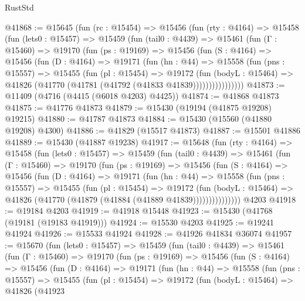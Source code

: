 \begin{lexlean}{RustStd}
\begin{coremodule}
@41868 := @15645
    (fun (rc : @15454) =>
    @15456
      (fun (rty : @4164) =>
      @15458
        (fun (lets0 : @15457) =>
        @15459
          (fun (tail0 : @4439) =>
          @15461
            (fun (Γ : @15460) =>
            @19170
              (fun (ps : @19169) =>
              @15456
                (fun (S : @4164) =>
                @15456
                  (fun (D : @4164) =>
                  @19171
                    (fun (hn : @44) =>
                    @15558
                      (fun (pns : @15557) =>
                      @15455
                        (fun (pl : @15454) =>
                        @19172
                          (fun (bodyL : @15464) =>
                          @41826 (@41770 (@41781 (@41792 (@41833 @41839))))))))))))))))
@41873 := @11409 (@4716 (@4415 (@6018 @4203) @4425))
@41874 := @41868 @41873
@41875 := @41776 @41873
@41879 := @15430 (@19194 (@41875 @19208) @19215)
@41880 := @41787 @41873
@41884 := @15430 (@15560 (@41880 @19208) @4300)
@41886 := @41829 (@15517 @41873)
@41887 := @15501 @41886
@41889 := @15430 (@41887 @19238)
@41917 := @15648
    (fun (rty : @4164) =>
    @15458
      (fun (lets0 : @15457) =>
      @15459
        (fun (tail0 : @4439) =>
        @15461
          (fun (Γ : @15460) =>
          @19170
            (fun (ps : @19169) =>
            @15456
              (fun (S : @4164) =>
              @15456
                (fun (D : @4164) =>
                @19171
                  (fun (hn : @44) =>
                  @15558
                    (fun (pns : @15557) =>
                    @15455
                      (fun (pl : @15454) =>
                      @19172
                        (fun (bodyL : @15464) =>
                        @41826 (@41770 (@41879 (@41884 (@41889 @41839)))))))))))))))
    @4203
@41918 := @19184 @4203
@41919 := @41918 @15448
@41923 := @15430 (@41768 (@19181 (@19183 @41919)))
@41924 := @15530 @4203
@41925 := @19241 @41924
@41926 := @15533 @41924
@41928 := @41926 @41834 @36074
@41957 := @15670
    (fun (lets0 : @15457) =>
    @15459
      (fun (tail0 : @4439) =>
      @15461
        (fun (Γ : @15460) =>
        @19170
          (fun (ps : @19169) =>
          @15456
            (fun (S : @4164) =>
            @15456
              (fun (D : @4164) =>
              @19171
                (fun (hn : @44) =>
                @15558
                  (fun (pns : @15557) =>
                  @15455
                    (fun (pl : @15454) =>
                    @19172
                      (fun (bodyL : @15464) =>
                      @41826
                        (@41923

\end{coremodule}
\end{lexlean}
